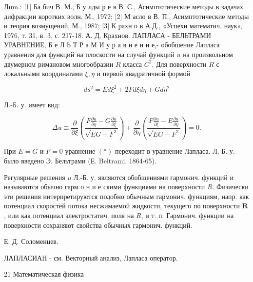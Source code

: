 \documentclass[10pt]{article}
\begin{document}
Лum.: [1] Ба бич В. М., Б у лды р е в В. С., Асимптотические методы в задачах дифракции коротких волн, М., 1972; [2] М асло в В. П., Асимптотические методы и теория возмущений, М., 1987; [3] К рахн о в А.Д., «Успехи математич. наук», 1976, т. 31, в. 3, с. 217-18. А. Д. Крахнов. ЛАПЛАСА - БЕЛЬТРАМИ УРАВНЕНИЕ, Б е Л Ь Т Р а М И у р а в н е н и е,- обобшение Лапласа уравнения для функций на плоскости на случай функций $u$ на произвольном двумерном римановом многообразии $R$ класса $C^{2}$. Для поверхности $R$ с локальными координатами $\xi, \eta$ и первой квадратичной формой



\[

d s^{2}=E d \xi^{2}+2 F d \xi d \eta+G d \eta^{2}

\]



Л.-Б. у. имеет вид:



\[

\Delta u \equiv \frac{\partial}{\partial \xi}\left(\frac{F \frac{\partial u}{\partial \eta}-G \frac{\partial u}{\partial \xi}}{\sqrt{E G-F^{2}}}\right)+\frac{\partial}{\partial \eta}\left(\frac{F \frac{\partial u}{\partial \xi}-E \frac{\partial u}{\partial \eta}}{\sqrt{E G-F^{2}}}\right)=0 .

\]



При $E=G$ и $F=0$ уравнение $(*)$ переходит в уравнение Лапласа. Л.-Б. у. было введено Э. Бельтрами (Е. Beltrami, 1864-65).



Регулярные решения $u$ Л.-Б. у. являются обобщениями гармонич. функций и называются обычно гарм о н и е скими функциями на поверхности $R$. Физически эти решения интерпретируются подобно обычным гармонич. функциям, напр. как потенциал скоростей потока несжимаемой жидкости, текущего по поверхности $\boldsymbol{R}$, или как потенциал электростатич. поля на $R$, и т. п. Гармонич. функции на поверхности сохраняют свойства обычных гармонич. функций.



Е. Д. Соломенцев.



ЛАПЛАСИАН - см. Векторный анализ, Лапласа оператор.



21 Математическая физика
\end{document}
